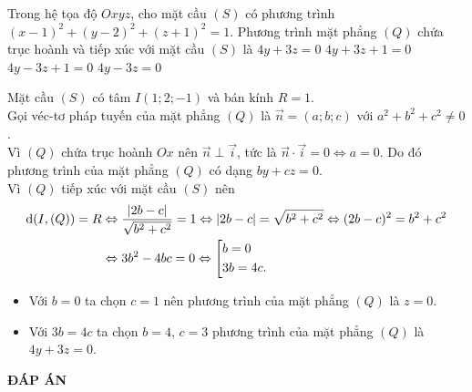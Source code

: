 \begin{ex}%
 Trong hệ tọa độ $Oxyz$, cho mặt cầu $(S)$ có phương trình $(x - 1)^2 + (y - 2)^2 + (z + 1)^2 = 1$. Phương trình mặt phẳng $(Q)$ chứa trục hoành và tiếp xúc với mặt cầu $(S)$ là
 \choice
  {\True $4y + 3z = 0$}
  {$4y + 3z + 1 = 0$}
  {$4y - 3z + 1 = 0$}
  {$4y - 3z = 0$}
 \loigiai
  {
  Mặt cầu $(S)$ có tâm $I(1;2;-1)$ và bán kính $R = 1$.\\
  Gọi véc-tơ pháp tuyến của mặt phẳng $(Q)$ là $\vec{n} = (a;b;c)$ với $a^2 + b^2 + c^2 \neq 0$.\\
  Vì $(Q)$ chứa trục hoành $Ox$ nên $\vec{n} \perp \vec{i}$, tức là $\vec{n} \cdot \vec{i} = 0 \Leftrightarrow a = 0$. Do đó phương trình của mặt phẳng $(Q)$ có dạng $by + cz = 0$.\\
  Vì $(Q)$ tiếp xúc với mặt cầu $(S)$ nên
  \begin{align*}
   \mathrm{d}(I,(Q)) = R & \Leftrightarrow \dfrac{|2b - c|}{\sqrt{b^2 + c^2}} = 1 \Leftrightarrow |2b - c| = \sqrt{b^2 + c^2} \Leftrightarrow (2b - c)^2 = b^2 + c^2 \\
   & \Leftrightarrow 3b^2 - 4bc = 0 \Leftrightarrow \left[\begin{aligned}& b = 0 \\& 3b = 4c.\end{aligned}\right.
  \end{align*}
  \begin{itemize}
   \item Với $b = 0$ ta chọn $c = 1$ nên phương trình của mặt phẳng $(Q)$ là $z = 0$.
   \item Với $3b = 4c$ ta chọn $b = 4$, $c = 3$ phương trình của mặt phẳng $(Q)$ là $4y + 3z = 0$.
  \end{itemize}
  }
\end{ex}

 
\newpage
\begin{center}
	\textbf{ĐÁP ÁN}
\end{center}
\begin{multicols}{10}
	
\end{multicols}
